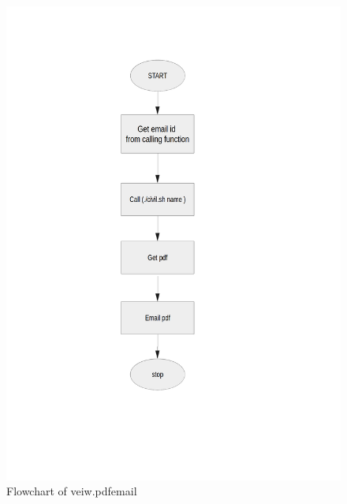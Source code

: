 \begin{figure}[H]
\centering \includegraphics[scale=0.27]{images/flowchartpdf.png}
\caption{Flowchart of veiw.pdfemail}
\end{figure}
